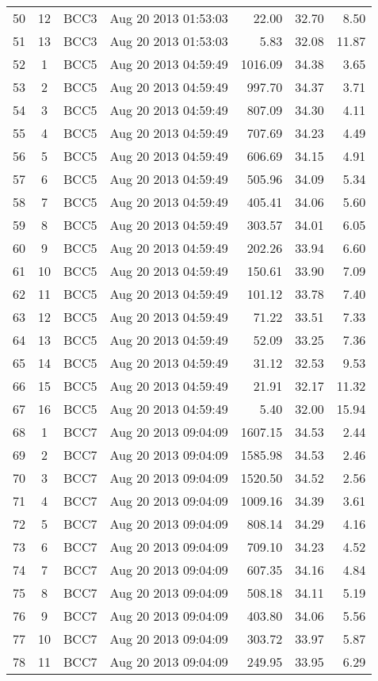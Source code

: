 \documentclass{article}
\begin{document}
\begin{longtable}{ccllrrr}
50&12&BCC3&Aug 20 2013 01:53:03&22.00&32.70&8.50\\
51&13&BCC3&Aug 20 2013 01:53:03&5.83&32.08&11.87\\
\hline 
52&1&BCC5&Aug 20 2013 04:59:49&1016.09&34.38&3.65\\
53&2&BCC5&Aug 20 2013 04:59:49&997.70&34.37&3.71\\
54&3&BCC5&Aug 20 2013 04:59:49&807.09&34.30&4.11\\
55&4&BCC5&Aug 20 2013 04:59:49&707.69&34.23&4.49\\
56&5&BCC5&Aug 20 2013 04:59:49&606.69&34.15&4.91\\
57&6&BCC5&Aug 20 2013 04:59:49&505.96&34.09&5.34\\
58&7&BCC5&Aug 20 2013 04:59:49&405.41&34.06&5.60\\
59&8&BCC5&Aug 20 2013 04:59:49&303.57&34.01&6.05\\
60&9&BCC5&Aug 20 2013 04:59:49&202.26&33.94&6.60\\
61&10&BCC5&Aug 20 2013 04:59:49&150.61&33.90&7.09\\
62&11&BCC5&Aug 20 2013 04:59:49&101.12&33.78&7.40\\
63&12&BCC5&Aug 20 2013 04:59:49&71.22&33.51&7.33\\
64&13&BCC5&Aug 20 2013 04:59:49&52.09&33.25&7.36\\
65&14&BCC5&Aug 20 2013 04:59:49&31.12&32.53&9.53\\
66&15&BCC5&Aug 20 2013 04:59:49&21.91&32.17&11.32\\
67&16&BCC5&Aug 20 2013 04:59:49&5.40&32.00&15.94\\
\hline 
68&1&BCC7&Aug 20 2013 09:04:09&1607.15&34.53&2.44\\
69&2&BCC7&Aug 20 2013 09:04:09&1585.98&34.53&2.46\\
70&3&BCC7&Aug 20 2013 09:04:09&1520.50&34.52&2.56\\
71&4&BCC7&Aug 20 2013 09:04:09&1009.16&34.39&3.61\\
72&5&BCC7&Aug 20 2013 09:04:09&808.14&34.29&4.16\\
73&6&BCC7&Aug 20 2013 09:04:09&709.10&34.23&4.52\\
74&7&BCC7&Aug 20 2013 09:04:09&607.35&34.16&4.84\\
75&8&BCC7&Aug 20 2013 09:04:09&508.18&34.11&5.19\\
76&9&BCC7&Aug 20 2013 09:04:09&403.80&34.06&5.56\\
77&10&BCC7&Aug 20 2013 09:04:09&303.72&33.97&5.87\\
78&11&BCC7&Aug 20 2013 09:04:09&249.95&33.95&6.29\\

\end{longtable}
\end{document}
